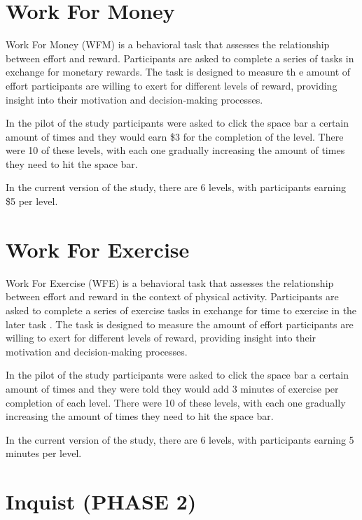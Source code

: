 \documentclass[
]{book}
\begin{document}
\section{Work For Money}\label{work-for-money}

Work For Money (WFM) is a behavioral task that assesses the relationship between effort and reward. Participants are asked to complete a series of tasks in exchange for monetary rewards. The task is designed to measure th e amount of effort participants are willing to exert for different levels of reward, providing insight into their motivation and decision-making processes.

In the pilot of the study participants were asked to click the space bar a certain amount of times and they would earn \$3 for the completion of the level. There were 10 of these levels, with each one gradually increasing the amount of times they need to hit the space bar.

In the current version of the study, there are 6 levels, with participants earning \$5 per level.

\section{Work For Exercise}\label{work-for-exercise}

Work For Exercise (WFE) is a behavioral task that assesses the relationship between effort and reward in the context of physical activity. Participants are asked to complete a series of exercise tasks in exchange for time to exercise in the later task . The task is designed to measure the amount of effort participants are willing to exert for different levels of reward, providing insight into their motivation and decision-making processes.

In the pilot of the study participants were asked to click the space bar a certain amount of times and they were told they would add 3 minutes of exercise per completion of each level. There were 10 of these levels, with each one gradually increasing the amount of times they need to hit the space bar.

In the current version of the study, there are 6 levels, with participants earning 5 minutes per level.

\section{Inquist (PHASE 2)}\label{inquist-phase-2}
\end{document}
